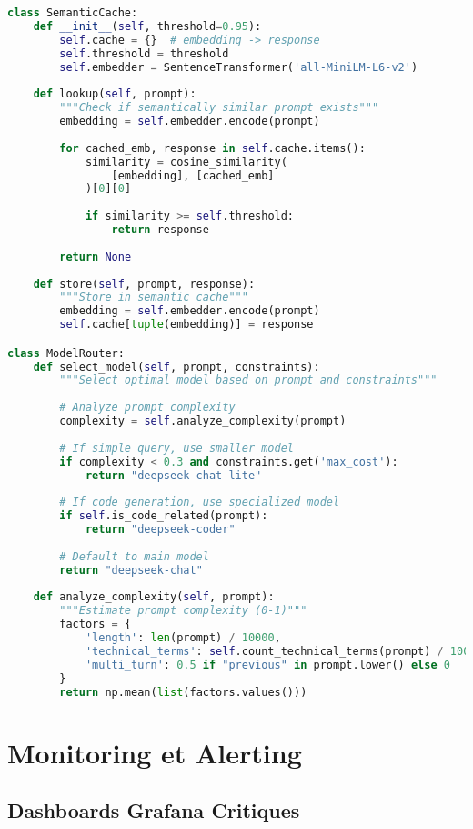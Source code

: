 \documentclass[12pt,a4paper]{article}
\begin{document}
\begin{lstlisting}[language=python, caption=Request Optimizer avec ML]
class SemanticCache:
    def __init__(self, threshold=0.95):
        self.cache = {}  # embedding -> response
        self.threshold = threshold
        self.embedder = SentenceTransformer('all-MiniLM-L6-v2')
    
    def lookup(self, prompt):
        """Check if semantically similar prompt exists"""
        embedding = self.embedder.encode(prompt)
        
        for cached_emb, response in self.cache.items():
            similarity = cosine_similarity(
                [embedding], [cached_emb]
            )[0][0]
            
            if similarity >= self.threshold:
                return response
        
        return None
    
    def store(self, prompt, response):
        """Store in semantic cache"""
        embedding = self.embedder.encode(prompt)
        self.cache[tuple(embedding)] = response

class ModelRouter:
    def select_model(self, prompt, constraints):
        """Select optimal model based on prompt and constraints"""
        
        # Analyze prompt complexity
        complexity = self.analyze_complexity(prompt)
        
        # If simple query, use smaller model
        if complexity < 0.3 and constraints.get('max_cost'):
            return "deepseek-chat-lite"
        
        # If code generation, use specialized model
        if self.is_code_related(prompt):
            return "deepseek-coder"
        
        # Default to main model
        return "deepseek-chat"
    
    def analyze_complexity(self, prompt):
        """Estimate prompt complexity (0-1)"""
        factors = {
            'length': len(prompt) / 10000,
            'technical_terms': self.count_technical_terms(prompt) / 100,
            'multi_turn': 0.5 if "previous" in prompt.lower() else 0
        }
        return np.mean(list(factors.values()))
\end{lstlisting}

\newpage
\section{Monitoring et Alerting}

\subsection{Dashboards Grafana Critiques}
\end{document}

